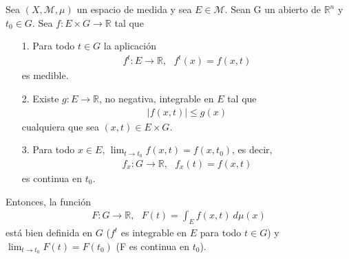 \begin{teo}
    Sea $(X, \mathcal{M}, \mu)$ un espacio de medida y sea $E \in \mathcal{M}$. Sean G un abierto de $\mathbb{R}^n$ y $t_0 \in G$. Sea $f: E \times G \longrightarrow \mathbb{R}$ tal que
    \begin{enumerate}
        \item[1.] Para todo $t \in G$ la aplicación
              \begin{align*}
                  f^t: E \longrightarrow \mathbb{R}, \ \ \ f^t(x) = f(x,t)
              \end{align*}
              es medible.
        \item[2.] Existe $g: E \longrightarrow \mathbb{R}$, no negativa, integrable en $E$ tal que
              \begin{align*}
                  |f(x,t)| \leq g(x)
              \end{align*}
              cualquiera que sea $(x,t) \in E \times G$.
        \item[3.] Para todo $x \in E$, $\lim_{t \to t_0}{f(x,t)} = f(x,t_0)$, es decir,
              \begin{align*}
                  f_x : G \longrightarrow \mathbb{R}, \ \ \ f_x(t) = f(x,t)
              \end{align*}
              es continua en $t_0$.
    \end{enumerate}
    Entonces, la función
    \begin{align*}
        F: G \longrightarrow \mathbb{R}, \ \ \ F(t) = \int_{E}{f(x,t) \ d\mu(x)}
    \end{align*}
    está bien definida en $G$ ($f^t$ es integrable en $E$ para todo $t \in G$) y $\lim_{t \to t_0}{F(t)} = F(t_0)$ (F es continua en $t_0$).
\end{teo}

